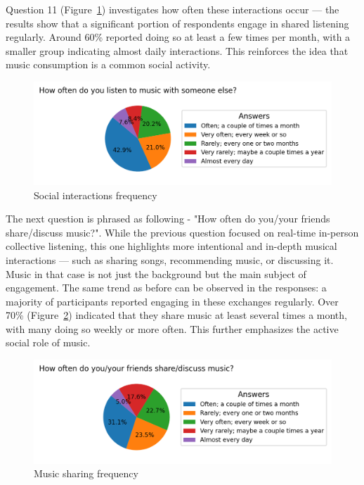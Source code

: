 Question 11 (Figure~\ref{fig:listentogetherfreq}) investigates how often these interactions occur —
the results show that a significant portion of respondents engage in shared listening regularly.
Around 60\% reported doing so at least a few times per month,
with a smaller group indicating almost daily interactions.
This reinforces the idea that music consumption is a common social activity.


\begin{figure}[htbp]
    \centering
    \includegraphics[width=1\textwidth, keepaspectratio]{charts/listen together freq.png}
    \caption{Social interactions frequency}
    \label{fig:listentogetherfreq}
\end{figure}

The next question is phrased as following - "How often do you/your friends share/discuss music?".
While the previous question focused on real-time in-person collective listening,
this one highlights more intentional and in-depth musical interactions — such as sharing songs,
recommending music, or discussing it. Music in that case is not just the background but the main subject of engagement.
The same trend as before can be observed in the responses: a majority of participants reported engaging in these exchanges regularly.
Over 70\% (Figure~\ref{fig:sharefreq}) indicated that they share music at least several times a month, with many doing so weekly or more often.
This further emphasizes the active social role of music.

\begin{figure}[htbp]
    \centering
    \includegraphics[width=1\textwidth, keepaspectratio]{charts/share freq.png}
    \caption{Music sharing frequency}
    \label{fig:sharefreq}
\end{figure}

